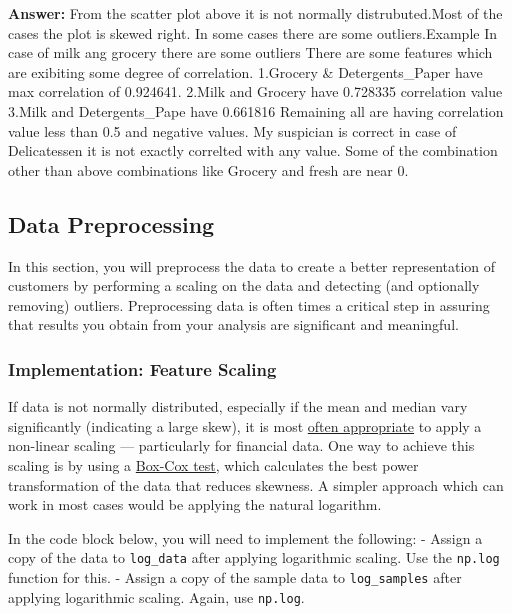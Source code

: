 \documentclass[11pt]{article}
\begin{document}
    \textbf{Answer:} From the scatter plot above it is not normally
distrubuted.Most of the cases the plot is skewed right. In some cases
there are some outliers.Example In case of milk ang grocery there are
some outliers There are some features which are exibiting some degree of
correlation. 1.Grocery \& Detergents\_Paper have max correlation of
0.924641. 2.Milk and Grocery have 0.728335 correlation value 3.Milk and
Detergents\_Pape have 0.661816 Remaining all are having correlation
value less than 0.5 and negative values. My suspician is correct in case
of Delicatessen it is not exactly correlted with any value. Some of the
combination other than above combinations like Grocery and fresh are
near 0.

    \subsection{Data Preprocessing}\label{data-preprocessing}

In this section, you will preprocess the data to create a better
representation of customers by performing a scaling on the data and
detecting (and optionally removing) outliers. Preprocessing data is
often times a critical step in assuring that results you obtain from
your analysis are significant and meaningful.

    \subsubsection{Implementation: Feature
Scaling}\label{implementation-feature-scaling}

If data is not normally distributed, especially if the mean and median
vary significantly (indicating a large skew), it is most
\href{http://econbrowser.com/archives/2014/02/use-of-logarithms-in-economics}{often
appropriate} to apply a non-linear scaling --- particularly for
financial data. One way to achieve this scaling is by using a
\href{http://scipy.github.io/devdocs/generated/scipy.stats.boxcox.html}{Box-Cox
test}, which calculates the best power transformation of the data that
reduces skewness. A simpler approach which can work in most cases would
be applying the natural logarithm.

In the code block below, you will need to implement the following: -
Assign a copy of the data to \texttt{log\_data} after applying
logarithmic scaling. Use the \texttt{np.log} function for this. - Assign
a copy of the sample data to \texttt{log\_samples} after applying
logarithmic scaling. Again, use \texttt{np.log}.
\end{document}
